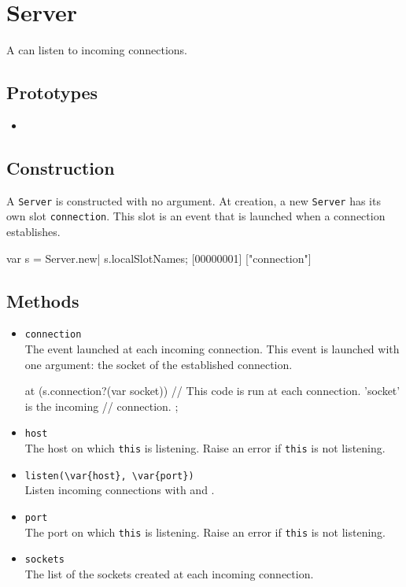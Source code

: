 \section{Server}

A  can listen to incoming connections.

\subsection{Prototypes}
\begin{itemize}
\item {}
\end{itemize}

\subsection{Construction}

A \lstinline|Server| is constructed with no argument. At creation, a
new \lstinline|Server| has its own slot \lstinline|connection|. This
slot is an event that is launched when a connection establishes.

\begin{urbiscript}
var s = Server.new|
s.localSlotNames;
[00000001] ["connection"]
\end{urbiscript}

\subsection{Methods}
\begin{itemize}
\item \lstinline|connection|\\
  The event launched at each incoming connection. This event is
  launched with one argument: the socket of the established connection.
\begin{urbiscript}[firstnumber=last]
at (s.connection?(var socket))
{
  // This code is run at each connection. 'socket' is the incoming
  // connection.
};
\end{urbiscript}

\item \lstinline|host|\\
  The host on which \lstinline|this| is listening. Raise an error if
  \lstinline|this| is not listening.

\item \lstinline|listen(\var{host}, \var{port})|\\
  Listen incoming connections with  and .

\item \lstinline|port|\\
  The port on which \lstinline|this| is listening. Raise an error if
  \lstinline|this| is not listening.

\item \lstinline|sockets|\\
  The list of the sockets created at each incoming connection.
\end{itemize}

